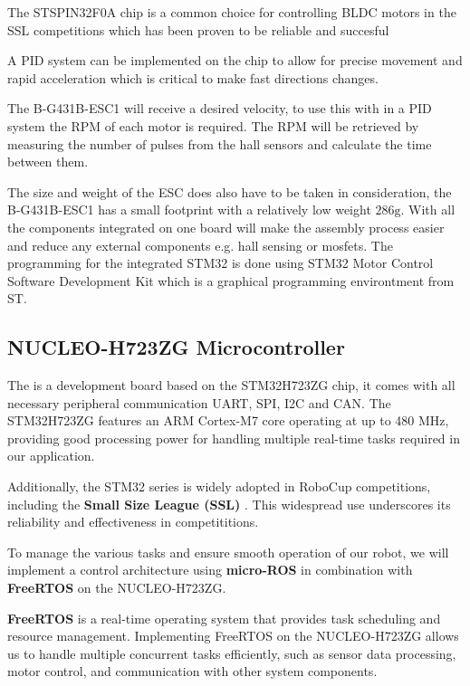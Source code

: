 \documentclass[a4paper,12pt]{article}
\begin{document}
  The STSPIN32F0A chip is a common choice for controlling BLDC motors in
  the SSL competitions which has been proven to be reliable and
  succesful
  \cite{ryllExtendedTeamDescription}\cite{abousaleh2024TeamDescription}

  A PID system can be implemented on the chip to allow for precise
  movement and rapid acceleration which is critical to make fast
  directions changes.

  The B-G431B-ESC1 will receive a desired velocity, to use this with in
  a PID system the RPM of each motor is required. The RPM will be
  retrieved by measuring the number of pulses from the hall sensors and
  calculate the time between them.

  The size and weight of the ESC does also have to be taken in
  consideration, the B-G431B-ESC1 has a small footprint with a
  relatively low weight $286\text{g}$. With all the components
  integrated on one board will make the assembly process easier and
  reduce any external components e.g. hall sensing or mosfets. The
  programming for the integrated STM32 is done using STM32 Motor Control
  Software Development Kit which is a graphical programming environtment
  from ST.

  \subsection*{NUCLEO-H723ZG Microcontroller}

  The  is a development board based on the
  STM32H723ZG chip, it comes with all necessary peripheral communication
  UART, SPI, I2C and CAN. The STM32H723ZG features an ARM Cortex-M7 core
  operating at up to 480 MHz, providing good processing power for
  handling multiple real-time tasks required in our application.

  Additionally, the STM32 series is widely adopted in RoboCup
  competitions, including the \textbf{Small Size League (SSL)} \cite{ryllExtendedTeamDescription}\cite{zhaoZJUNlictExtendedTeam}\cite{wuCompilationErrorTeam}.
  This widespread use underscores its reliability and effectiveness in
  competititions.

  To manage the various tasks and ensure smooth operation of our robot,
  we will implement a control architecture using \textbf{micro-ROS} in
  combination with \textbf{FreeRTOS} on the NUCLEO-H723ZG.

  \textbf{FreeRTOS} is a real-time operating system that provides task
  scheduling and resource management. Implementing FreeRTOS on the
  NUCLEO-H723ZG allows us to handle multiple concurrent tasks
  efficiently, such as sensor data processing, motor control, and
  communication with other system components.
\end{document}
